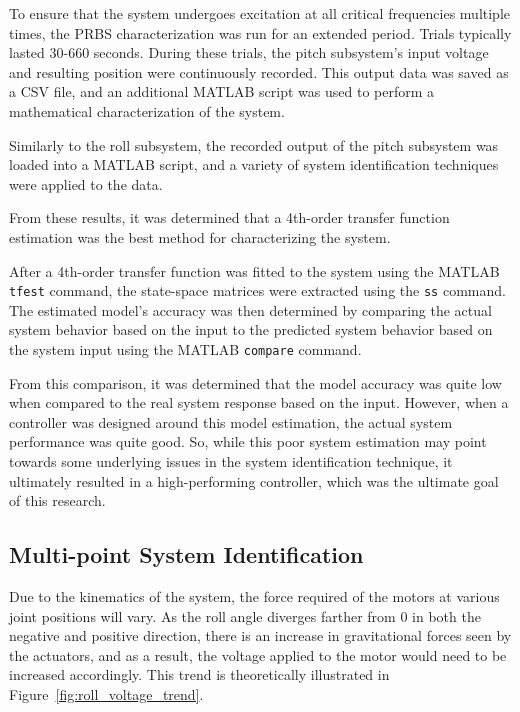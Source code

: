 To ensure that the system undergoes excitation at all critical frequencies multiple times, the PRBS characterization was run for an extended period. Trials typically lasted 30-660 seconds. During these trials, the pitch subsystem's input voltage and resulting position were continuously recorded. This output data was saved as a CSV file, and an additional MATLAB script was used to perform a mathematical characterization of the system.

Similarly to the roll subsystem, the recorded output of the pitch subsystem was loaded into a MATLAB script, and a variety of system identification techniques were applied to the data.

From these results, it was determined that a 4th-order transfer function estimation was the best method for characterizing the system.

After a 4th-order transfer function was fitted to the system using the MATLAB \texttt{tfest} command, the state-space matrices were extracted using the \texttt{ss} command. The estimated model's accuracy was then determined by comparing the actual system behavior based on the input to the predicted system behavior based on the system input using the MATLAB \texttt{compare} command.

From this comparison, it was determined that the model accuracy was quite low when compared to the real system response based on the input. However, when a controller was designed around this model estimation, the actual system performance was quite good. So, while this poor system estimation may point towards some underlying issues in the system identification technique, it ultimately resulted in a high-performing controller, which was the ultimate goal of this research.


\subsection{Multi-point System Identification}

Due to the kinematics of the system, the force required of the motors at various joint positions will vary. As the roll angle diverges farther from 0 in both the negative and positive direction, there is an increase in gravitational forces seen by the actuators, and as a result, the voltage applied to the motor would need to be increased accordingly. This trend is theoretically illustrated in Figure~\ref{fig:roll_voltage_trend}.

